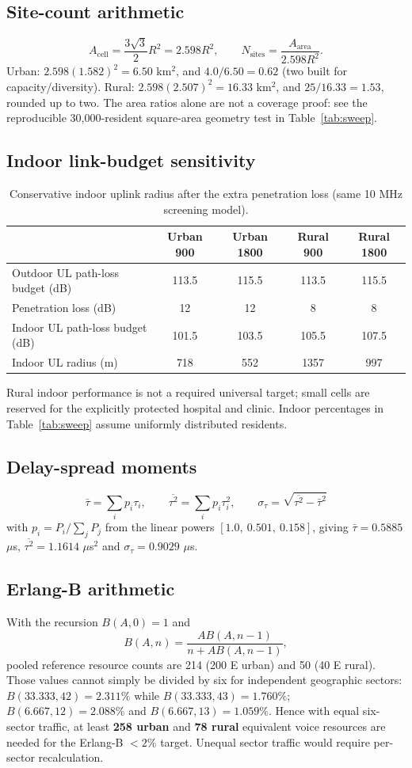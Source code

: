 \documentclass[9pt,a4paper]{extarticle}
\begin{document}
\subsection{Site-count arithmetic}
\[
A_{\text{cell}} = \frac{3\sqrt3}{2}R^2 = 2.598R^2,\qquad
N_{\text{sites}} = \frac{A_{\text{area}}}{2.598R^2}.
\]
Urban: $2.598(1.582)^2 = 6.50$ km$^2$, and $4.0/6.50 = 0.62$ (two built for
capacity/diversity). Rural: $2.598(2.507)^2 = 16.33$ km$^2$, and $25/16.33 = 1.53$, rounded
up to two. The area ratios alone are not a coverage proof: see the reproducible
30,000-resident square-area geometry test in Table~\ref{tab:sweep}.

\subsection{Indoor link-budget sensitivity}
\begin{table}[H]\centering\small
\caption{Conservative indoor uplink radius after the extra penetration loss (same 10 MHz screening model).}
\label{tab:lb_indoor}
\begin{tabular}{@{}lcccc@{}}\toprule
& Urban 900 & Urban 1800 & Rural 900 & Rural 1800 \\ \midrule
Outdoor UL path-loss budget (dB) & 113.5 & 115.5 & 113.5 & 115.5 \\
Penetration loss (dB) & 12 & 12 & 8 & 8 \\
Indoor UL path-loss budget (dB) & 101.5 & 103.5 & 105.5 & 107.5 \\
Indoor UL radius (m) & 718 & 552 & 1357 & 997 \\ \bottomrule
\end{tabular}
\end{table}
Rural indoor performance is not a required universal target; small cells
are reserved for the explicitly protected hospital and clinic. Indoor
percentages in Table~\ref{tab:sweep} assume uniformly distributed residents.

\subsection{Delay-spread moments}
\[
\bar\tau = \sum_i p_i\tau_i,\qquad
\overline{\tau^2} = \sum_i p_i\tau_i^2,\qquad
\sigma_\tau = \sqrt{\overline{\tau^2}-\bar\tau^2}
\]
with $p_i = P_i/\sum_j P_j$ from the linear powers $[1.0,\ 0.501,\ 0.158]$, giving
$\bar\tau=0.5885$ $\mu$s, $\overline{\tau^2}=1.1614$ $\mu$s$^2$ and
$\sigma_\tau=0.9029$ $\mu$s.

\subsection{Erlang-B arithmetic}
With the recursion $B(A,0)=1$ and
\[
B(A,n)=\frac{A B(A,n-1)}{n+A B(A,n-1)},
\]
pooled reference resource counts are 214 (200 E urban) and 50 (40 E rural).
Those values cannot simply be divided by six for independent geographic
sectors: $B(33.333,42)=2.311\%$ while $B(33.333,43)=1.760\%$;
$B(6.667,12)=2.088\%$ and $B(6.667,13)=1.059\%$.
Hence with equal six-sector traffic, at least \textbf{258 urban} and
\textbf{78 rural} equivalent voice resources are needed for the Erlang-B
$<2\%$ target. Unequal sector traffic would require per-sector recalculation.
\end{document}
